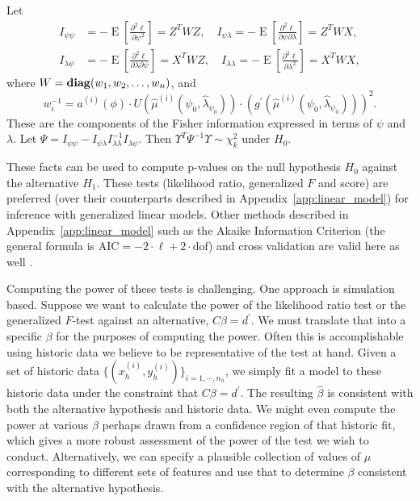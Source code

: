 \documentclass[12pt]{article}
\DeclareMathOperator{\Exp}{\operatorname{E}}
\begin{document}
Let 
\begin{align*}
   I_{\psi \psi} &= - \Exp \left[ \frac{\partial^2 \ell}{\partial \psi^2} \right] = Z^T W Z, \quad I_{\psi \lambda} = - \Exp \left[ \frac{\partial^2 \ell}{\partial \psi \partial \lambda} \right] = Z^T W X,\\
   I_{\lambda \psi} &= - \Exp \left[ \frac{\partial^2 \ell}{\partial \lambda \partial \psi} \right] = X^T W Z, \quad I_{\lambda \lambda} = - \Exp \left[ \frac{\partial^2 \ell}{\partial \lambda^2} \right] = X^T W X,
\end{align*}
where $W = \mathop{\bf diag}(w_1, w_2, \ldots, w_n)$, and
\begin{displaymath}
w_i^{-1} = a^{(i)}(\phi) \cdot U(\hat{\mu}^{(i)}(\psi_0, \hat{\lambda}_{\psi_0})) \cdot \left(g^\prime(\hat{\mu}^{(i)}(\psi_0, \hat{\lambda}_{\psi_0}))\right)^2.
\end{displaymath}
These are the components of the Fisher information expressed in terms of $\psi$ and $\lambda$. Let $\Psi = I_{\psi \psi} - I_{\psi \lambda} I_{\lambda \lambda}^{-1} I_{\lambda \psi}$. Then $\Upsilon^T \Psi^{-1} \Upsilon \sim \chi_k^2$ under $H_0$.

These facts can be used to compute p-values on the null hypothesis $H_0$ against the alternative $H_1$. These tests (likelihood ratio, generalized $F$ and score) are preferred (over their counterparts described in Appendix~\ref{app:linear_model}) for inference with generalized linear models. Other methods described in Appendix~\ref{app:linear_model} such as the Akaike Information Criterion (the general formula is $\textrm{AIC} = -2 \cdot \ell + 2 \cdot \textrm{dof}$) and cross validation are valid here as well \cite[\S 3.1.4]{Wood:2017}.

Computing the power of these tests is challenging. One approach is simulation based. Suppose we want to calculate the power of the likelihood ratio test or  the generalized $F$-test against an alternative, $C \beta = d^\prime$. We must translate that into a specific $\beta$ for the purposes of computing the power. Often this is accomplishable using historic data we believe to be representative of the test at hand. Given a set of historic data $\{ (x_h^{(i)}, y_h^{(i)}) \}_{i=1, \cdots, n_h}$, we simply fit a model to these historic data under the constraint that $C \beta = d^\prime$. The resulting $\hat{\beta}$ is consistent with both the alternative hypothesis and historic data. We might even compute the power at various $\beta$ perhaps drawn from a confidence region of that historic fit, which gives a more robust assessment of the power of the test we wish to conduct. Alternatively, we can specify a plausible collection of values of $\mu$ corresponding to different sets of features and use that to determine $\beta$ consistent with the alternative hypothesis.
\end{document}
